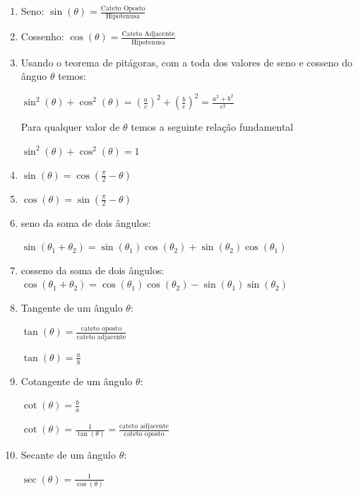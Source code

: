 \begin{multicols*}{2}
\begin{tikzpicture}[x=0.75pt,y=0.75pt,yscale=-1,xscale=1]
    \end{tikzpicture}

    \begin{enumerate}
        \item Seno: $\sin(\theta) = \frac{ \mbox{Cateto Oposto}}{\mbox{Hipotenusa}}$
        \item Cossenho: $\cos( \theta ) = \frac{ \mbox{Cateto Adjacente}}{\mbox{Hipotenusa}}$
        \item Usando o teorema de pitágoras, com a toda dos valores de seno e cosseno do ânguo $\theta$ 		temos:

              $\sin^2(\theta) + \cos^2(\theta) =  \left( \frac{a}{c} \right)^2 + \left(  \frac{b}{c} \right)^2 =
                  \frac{a^2 + b^2}{c^2}$

              Para qualquer valor de $\theta$ temos a seguinte relação fundamental

              $\sin^2 (\theta) + \cos^2(\theta) = 1$

        \item $\sin(\theta)  = \cos \left( \frac{\pi}{2} - \theta\right)$
        \item $\cos(\theta)  = \sin \left( \frac{\pi}{2} - \theta\right)$
        \item seno da soma de dois ângulos:

              $\sin(\theta_1 + \theta_2) = \sin(\theta_1) \cos(\theta_2) + \sin( \theta_2) \cos(\theta_1)$

        \item cosseno da soma de dois ângulos:
              $\cos(\theta_1 + \theta_2) = \cos(\theta_1) \cos(\theta_2) - \sin(\theta_1) \sin(\theta_2)$

        \item Tangente de um ângulo $\theta$:

              $\tan(\theta) = \frac{\mbox{cateto oposto} }{\mbox{cateto adjacente}}$

              $\tan(\theta) = \frac{a}{b}$

        \item Cotangente de um ângulo $\theta$:

              $\cot(\theta) = \frac{b}{a}$

              $\cot(\theta) = \frac{1}{\tan(\theta)} = \frac{\mbox{cateto adjacente}}{\mbox{cateto oposto}}$

        \item Secante de um ângulo $\theta$:

              $\sec(\theta) = \frac{1}{\cos(\theta)} $


\end{enumerate}
\end{multicols*}
